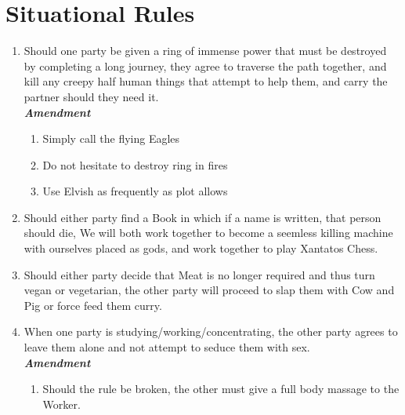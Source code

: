 
 \section{Situational Rules}

 \begin{enumerate}
   \item Should one party be given a ring of immense power that must be destroyed by completing a long journey, they agree to traverse the path together, 
   and kill any creepy half human things that attempt to help them, and carry the partner should they need it.
	\\ \textbf{\emph{Amendment}}
  	\begin{enumerate}
    	\item Simply call the flying Eagles
    	\item Do not hesitate to destroy ring in fires
    	\item Use Elvish as frequently as plot allows
  	\end{enumerate}
  	
   	\item Should either party find a Book in which if a name is written, that person should die, We will both work together 
   to become a seemless killing machine with ourselves placed as gods, and work together to play Xantatos Chess.
   \setcounter{enumi}{3}
   \item Should either party decide that Meat is no longer required and thus turn vegan or vegetarian, the other party will proceed to slap 
   them with Cow and Pig or force feed them curry.
   \item When one party is studying/working/concentrating, the other party agrees to leave them alone and not attempt to seduce them with sex.
   \\ \textbf{\emph{Amendment}}
  \begin{enumerate}
    \item Should the rule be broken, the other must give a full body massage to the Worker.
  \end{enumerate}
  

\end{enumerate}
